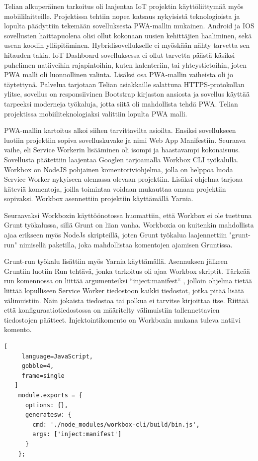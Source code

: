 \documentclass{tktltiki}
\begin{document}
Telian alkuperäinen tarkoitus oli laajentaa IoT projektin käyttöliittymää myös mobiililaitteille. Projektissa tehtiin nopea katsaus nykyisistä teknologioista ja lopulta päädyttiin tekemään sovelluksesta PWA-mallin mukainen. Android ja IOS sovellusten haittapuolena olisi ollut kokonaan uusien kehittäjien haaliminen, sekä usean koodin ylläpitäminen. Hybridisovellukselle ei myöskään nähty tarvetta sen hitauden takia. IoT Dashboard sovelluksessa ei ollut tarvetta päästä käsiksi puhelimen natiiveihin rajapintoihin, kuten kalenteriin, tai yhteystietoihin, joten PWA malli oli luonnollinen valinta. Lisäksi osa PWA-mallin vaiheista oli jo täytettynä. Palvelua tarjotaan Telian asiakkaille salattuna HTTPS-protokollan ylitse, sovellus on responsiivinen Bootstrap kirjaston ansiosta ja sovellus käyttää tarpeeksi moderneja työkaluja, jotta siitä oli mahdollista tehdä PWA. Telian projektissa mobiiliteknologiaksi valittiin lopulta PWA malli. 

PWA-mallin kartoitus alkoi siihen tarvittavilta asioilta. Ensiksi sovellukseen luotiin projektiin sopiva sovelluskuvake ja nimi Web App Manifestiin. Seuraava vaihe, eli Service Workerin lisääminen oli isompi ja haastavampi kokonaisuus. Sovellusta päätettiin laajentaa Googlen tarjoamalla Workbox CLI työkalulla. Workbox on NodeJS pohjainen komentoriviohjelma, jolla on helppoa luoda Service Worker nykyiseen olemassa olevaan projektiin. Lisäksi ohjelma tarjoaa käteviä komentoja, joilla toimintaa voidaan mukauttaa omaan projektiin sopivaksi. Workbox asennettiin projektiin käyttämällä Yarnia.

Seuraavaksi Workboxin käyttöönotossa huomattiin, että Workbox ei ole tuettuna Grunt työkalussa, sillä Grunt on liian vanha. Workboxia on kuitenkin mahdollista ajaa erikseen myös NodeJs skripteillä, joten Grunt työkalua laajennettiin "grunt-run" nimisellä paketilla, joka mahdollistaa komentojen ajamisen Gruntissa. 

Grunt-run työkalu lisättiin myös Yarnia käyttämällä. Asennuksen jälkeen Gruntiin luotiin Run tehtävä, jonka tarkoitus oli ajaa Workbox skriptit. Tärkeää run komennossa on liittää argumenteiksi “inject:manifest“ \cite{Googlec}, jolloin ohjelma tietää liittää lopulliseen Service Worker tiedostoon kaikki tiedostot, jotka pitää lisätä välimuistiin. Näin jokaista tiedostoa tai polkua ei tarvitse kirjoittaa itse. Riittää että konfiguraatiotiedostossa on määritelty välimuistiin tallennettavien tiedostojen päätteet. Injektointikomento on Workboxin mukana tuleva natiivi komento.

\begin{lstlisting}[
     language=JavaScript,
     gobble=4,
     frame=single
   ]
    module.exports = {
      options: {},
      generatesw: {
        cmd: './node_modules/workbox-cli/build/bin.js',
        args: ['inject:manifest']
      }
    };
\end{lstlisting}
\end{document}
